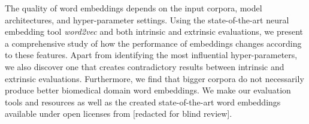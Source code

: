 The quality of word embeddings depends on the input corpora, model architectures, and hyper-parameter settings. Using the state-of-the-art neural embedding tool \textit{word2vec} and both intrinsic and extrinsic evaluations, we present a comprehensive study of how the performance of embeddings changes according to these features. Apart from identifying the most influential hyper-parameters, we also discover one that creates contradictory results between intrinsic and extrinsic evaluations. Furthermore, we find that bigger corpora do not necessarily produce better biomedical domain word embeddings. We make our evaluation tools and resources as well as the created state-of-the-art word embeddings available under open licenses from [redacted for blind review].
